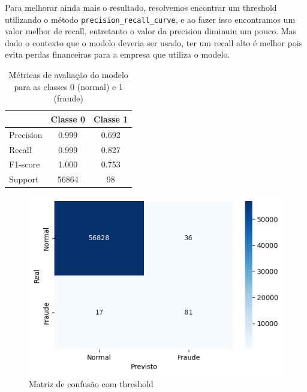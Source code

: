 \documentclass[conference]{IEEEtran}
\begin{document}
  Para melhorar ainda mais o resultado, resolvemos encontrar um threshold utilizando o método \texttt{precision\_recall\_curve}, e ao fazer isso encontramos um valor melhor de recall, entretanto o valor da precision diminuiu um pouco. Mas dado o contexto que o modelo deveria ser usado, ter um recall alto é melhor pois evita perdas financeiras para a empresa que utiliza o modelo.
  \begin{table}[H]
      \caption{Métricas de avaliação do modelo para as classes 0 (normal) e 1 (fraude)}
      \label{tab:matriz_confusao_regressao_logistica_com_threshold}
      \centering
      \begin{tabular}{lcc}
          \toprule
          & \textbf{Classe 0} & \textbf{Classe 1} \\
          \midrule
          Precision  & 0.999  & 0.692 \\
          Recall     & 0.999  & 0.827 \\
          F1-score   & 1.000  & 0.753 \\
          Support    & 56864  & 98    \\
          \bottomrule
      \end{tabular}
  \end{table}
  \begin{figure}[H]
    \centerline{\includegraphics[width=0.8\linewidth]{../output/matriz de confusao com threshold regressao logistica.png}}
    \caption{Matriz de confusão com threshold}
    \label{fig:matriz_confusao_regressao_logistica_com_threshold}
  \end{figure}
\end{document}
